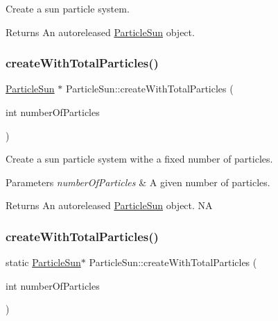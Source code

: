 Create a sun particle system.

\begin{DoxyReturn}{Returns}
An autoreleased \hyperlink{classParticleSun}{Particle\+Sun} object. 
\end{DoxyReturn}
\mbox{\label{classParticleSun_ae9bf564c73b0020dc02bce7e1327a784}} 
\subsubsection{\texorpdfstring{create\+With\+Total\+Particles()}{createWithTotalParticles()}\hspace{0.1cm}{\footnotesize\ttfamily [1/2]}}
{\footnotesize\ttfamily \hyperlink{classParticleSun}{Particle\+Sun} $\ast$ Particle\+Sun\+::create\+With\+Total\+Particles (\begin{DoxyParamCaption}\item[{int}]{number\+Of\+Particles }\end{DoxyParamCaption})\hspace{0.3cm}{\ttfamily [static]}}

Create a sun particle system withe a fixed number of particles.


\begin{DoxyParams}{Parameters}
{\em number\+Of\+Particles} & A given number of particles. \\
\hline
\end{DoxyParams}
\begin{DoxyReturn}{Returns}
An autoreleased \hyperlink{classParticleSun}{Particle\+Sun} object.  NA 
\end{DoxyReturn}
\mbox{\label{classParticleSun_ad1f2c33a346e33b0028b49326650d087}} 
\subsubsection{\texorpdfstring{create\+With\+Total\+Particles()}{createWithTotalParticles()}\hspace{0.1cm}{\footnotesize\ttfamily [2/2]}}
{\footnotesize\ttfamily static \hyperlink{classParticleSun}{Particle\+Sun}$\ast$ Particle\+Sun\+::create\+With\+Total\+Particles (\begin{DoxyParamCaption}\item[{int}]{number\+Of\+Particles }\end{DoxyParamCaption})\hspace{0.3cm}{\ttfamily [static]}}

